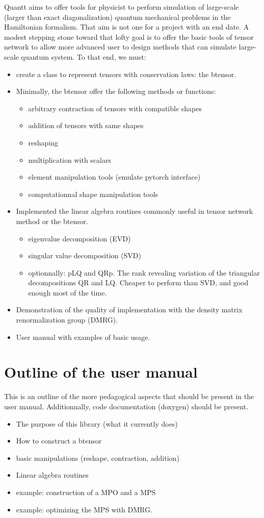 \documentclass[15pt]{book}
\begin{document}
Quantt aims to offer tools for physicist to perform simulation of large-scale (larger than exact diagonalization) quantum mechanical problems in the Hamiltonian formalism. That aim is not one for a project with an end date. A modest stepping stone toward that lofty goal is to offer the basic tools of tensor network to allow more advanced user to design methods that can simulate large-scale quantum system.
To that end, we must:
\begin{itemize}
    \item create a class to represent tensors with conservation laws: the btensor.
    \item Minimally, the btensor offer the following methods or functions:
    \begin{itemize}
        \item arbitrary contraction of tensors with compatible shapes
        \item addition of tensors with same shapes
        \item reshaping
        \item multiplication with scalars
        \item element manipulation tools (emulate pytorch interface)
        \item computationnal shape manipulation tools
    \end{itemize}
    \item Implemented the linear algebra routines commonly useful in tensor network method or the btensor.
    \begin{itemize}
        \item eigenvalue decomposition (EVD)
        \item singular value decomposition (SVD)
        \item optionnally: pLQ and QRp. The rank revealing variation of the triangular decompositions QR and LQ. Cheaper to perform than SVD, and good enough most of the time.
    \end{itemize}
    \item Demonstration of the quality of implementation with the density matrix renormalization group (DMRG).
    \item User manual with examples of basic usage.
\end{itemize}
\section{Outline of the user manual}
This is an outline of the more pedagogical aspects that should be present in the user manual.
Additionnally, code documentation (doxygen) should be present.
\begin{itemize}
    \item The purpose of this library (what it currently does)
    \item How to construct a btensor
    \item basic manipulations (reshape, contraction, addition)
    \item Linear algebra routines
    \item example: construction of a MPO and a MPS
    \item example: optimizing the MPS with DMRG.
\end{itemize}
\end{document}
